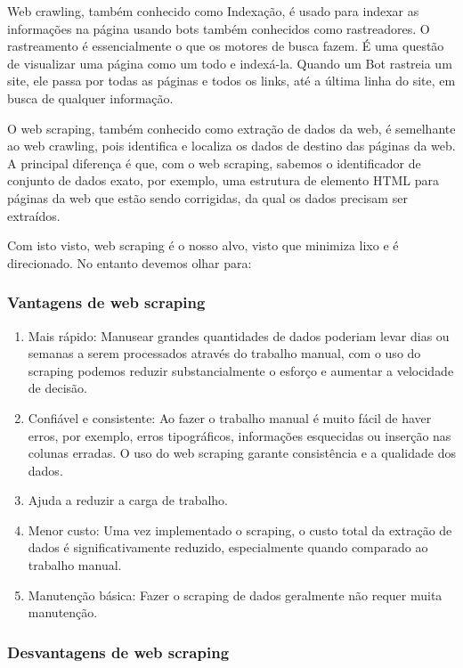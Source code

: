 \documentclass[a4paper,10pt]{article}
\begin{document}
Web crawling, também conhecido como Indexação, é usado para indexar as informações na página usando bots também conhecidos como rastreadores.
O rastreamento é essencialmente o que os motores de busca fazem.
É uma questão de visualizar uma página como um todo e indexá-la.
Quando um Bot rastreia um site, ele passa por todas as páginas e todos os links, até a última linha do site, em busca de qualquer informação.

O web scraping, também conhecido como extração de dados da web, é semelhante ao web crawling, pois identifica e localiza os dados de destino das páginas da web.
A principal diferença é que, com o web scraping, sabemos o identificador de conjunto de dados exato, por exemplo, uma estrutura de elemento HTML para páginas da web que estão sendo corrigidas, da qual os dados precisam ser extraídos.

Com isto visto, web scraping é o nosso alvo, visto que minimiza lixo e é direcionado.
No entanto devemos olhar para:

\subsubsection{Vantagens de web scraping}

\begin{enumerate}
    \item Mais rápido: Manusear grandes quantidades de dados poderiam levar dias ou semanas a serem processados através do trabalho manual, com o uso do scraping podemos reduzir substancialmente o esforço e aumentar a velocidade de decisão.
    \item Confiável e consistente: Ao fazer o trabalho manual é muito fácil de haver erros, por exemplo, erros tipográficos, informações esquecidas ou inserção nas colunas erradas. O uso do web scraping garante consistência e a qualidade dos dados.
    \item Ajuda a reduzir a carga de trabalho.
    \item Menor custo: Uma vez implementado o scraping, o custo total da extração de dados é significativamente reduzido, especialmente quando comparado ao trabalho manual.
    \item Manutenção básica: Fazer o scraping de dados geralmente não requer muita manutenção.
\end{enumerate}

\subsubsection{Desvantagens de web scraping}
\end{document}
